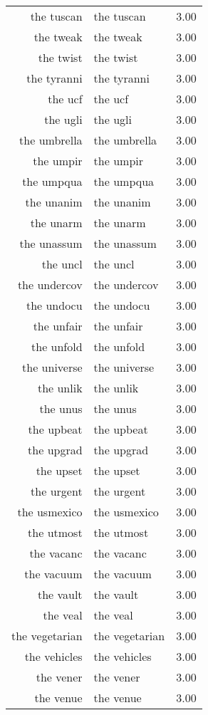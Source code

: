 \begin{table}[ht]
\begin{tabular}{rlr}
  the tuscan & the tuscan & 3.00 \\ 
  the tweak & the tweak & 3.00 \\ 
  the twist & the twist & 3.00 \\ 
  the tyranni & the tyranni & 3.00 \\ 
  the ucf & the ucf & 3.00 \\ 
  the ugli & the ugli & 3.00 \\ 
  the umbrella & the umbrella & 3.00 \\ 
  the umpir & the umpir & 3.00 \\ 
  the umpqua & the umpqua & 3.00 \\ 
  the unanim & the unanim & 3.00 \\ 
  the unarm & the unarm & 3.00 \\ 
  the unassum & the unassum & 3.00 \\ 
  the uncl & the uncl & 3.00 \\ 
  the undercov & the undercov & 3.00 \\ 
  the undocu & the undocu & 3.00 \\ 
  the unfair & the unfair & 3.00 \\ 
  the unfold & the unfold & 3.00 \\ 
  the universe & the universe & 3.00 \\ 
  the unlik & the unlik & 3.00 \\ 
  the unus & the unus & 3.00 \\ 
  the upbeat & the upbeat & 3.00 \\ 
  the upgrad & the upgrad & 3.00 \\ 
  the upset & the upset & 3.00 \\ 
  the urgent & the urgent & 3.00 \\ 
  the usmexico & the usmexico & 3.00 \\ 
  the utmost & the utmost & 3.00 \\ 
  the vacanc & the vacanc & 3.00 \\ 
  the vacuum & the vacuum & 3.00 \\ 
  the vault & the vault & 3.00 \\ 
  the veal & the veal & 3.00 \\ 
  the vegetarian & the vegetarian & 3.00 \\ 
  the vehicles & the vehicles & 3.00 \\ 
  the vener & the vener & 3.00 \\ 
  the venue & the venue & 3.00 \\ 

\end{tabular}
\end{table}
